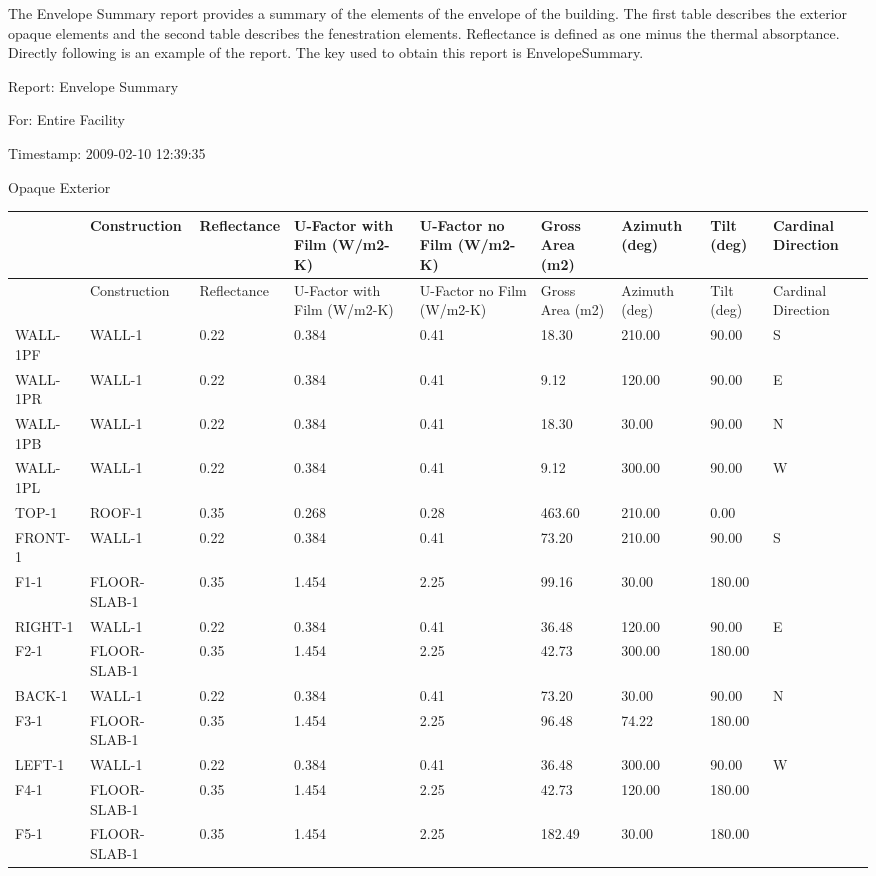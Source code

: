 The Envelope Summary report provides a summary of the elements of the envelope of the building. The first table describes the exterior opaque elements and the second table describes the fenestration elements. Reflectance is defined as one minus the thermal absorptance. Directly following is an example of the report. The key used to obtain this report is EnvelopeSummary.

Report: Envelope Summary

For: Entire Facility

Timestamp: 2009-02-10 12:39:35

Opaque Exterior

{\scriptsize
\begin{longtable}[c]{>{\raggedright}p{0.6in}>{\raggedright}p{0.6in}>{\raggedright}p{0.6in}>{\raggedright}p{0.6in}>{\raggedright}p{0.6in}>{\raggedright}p{0.6in}>{\raggedright}p{0.6in}>{\raggedright}p{0.6in}>{\raggedright}p{0.6in}}
\toprule 
~ & Construction & Reflectance & U-Factor with Film (W/m2-K) & U-Factor no Film (W/m2-K) & Gross Area (m2) & Azimuth (deg) & Tilt (deg) & Cardinal Direction \tabularnewline
\midrule
\endfirsthead

\toprule 
~ & Construction & Reflectance & U-Factor with Film (W/m2-K) & U-Factor no Film (W/m2-K) & Gross Area (m2) & Azimuth (deg) & Tilt (deg) & Cardinal Direction \tabularnewline
\midrule
\endhead

WALL-1PF & WALL-1 & 0.22 & 0.384 & 0.41 & 18.30 & 210.00 & 90.00 & S \tabularnewline
WALL-1PR & WALL-1 & 0.22 & 0.384 & 0.41 & 9.12 & 120.00 & 90.00 & E \tabularnewline
WALL-1PB & WALL-1 & 0.22 & 0.384 & 0.41 & 18.30 & 30.00 & 90.00 & N \tabularnewline
WALL-1PL & WALL-1 & 0.22 & 0.384 & 0.41 & 9.12 & 300.00 & 90.00 & W \tabularnewline
TOP-1 & ROOF-1 & 0.35 & 0.268 & 0.28 & 463.60 & 210.00 & 0.00 & ~ \tabularnewline
FRONT-1 & WALL-1 & 0.22 & 0.384 & 0.41 & 73.20 & 210.00 & 90.00 & S \tabularnewline
F1-1 & FLOOR-SLAB-1 & 0.35 & 1.454 & 2.25 & 99.16 & 30.00 & 180.00 & ~ \tabularnewline
RIGHT-1 & WALL-1 & 0.22 & 0.384 & 0.41 & 36.48 & 120.00 & 90.00 & E \tabularnewline
F2-1 & FLOOR-SLAB-1 & 0.35 & 1.454 & 2.25 & 42.73 & 300.00 & 180.00 & ~ \tabularnewline
BACK-1 & WALL-1 & 0.22 & 0.384 & 0.41 & 73.20 & 30.00 & 90.00 & N \tabularnewline
F3-1 & FLOOR-SLAB-1 & 0.35 & 1.454 & 2.25 & 96.48 & 74.22 & 180.00 & ~ \tabularnewline
LEFT-1 & WALL-1 & 0.22 & 0.384 & 0.41 & 36.48 & 300.00 & 90.00 & W \tabularnewline
F4-1 & FLOOR-SLAB-1 & 0.35 & 1.454 & 2.25 & 42.73 & 120.00 & 180.00 & ~ \tabularnewline
F5-1 & FLOOR-SLAB-1 & 0.35 & 1.454 & 2.25 & 182.49 & 30.00 & 180.00 & ~ \tabularnewline
\bottomrule
\end{longtable}}


